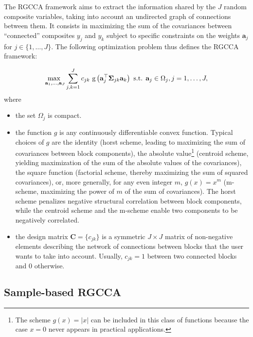 \documentclass[
]{jss}
\begin{document}
The RGCCA framework aims to extract the information shared by the \(J\)
random composite variables, taking into account an undirected graph of
connections between them. It consists in maximizing the sum of the
covariances between ``connected'' composites \(y_j\) and \(y_k\) subject
to specific constraints on the weights \(\mathbf a_j\) for
\(j \in \{1, \ldots, J\}\). The following optimization problem thus
defines the RGCCA framework:

\begin{equation}
\underset{\mathbf{a}_1, \ldots,\mathbf{a}_J}{\text{max }}  \displaystyle  \sum_{j, k = 1}^J c_{jk} \text{
g}\left(\mathbf{a}_j^\top  \mathbf \Sigma_{jk} \mathbf{a}_k\right)\\
\text{ s.t. } \mathbf{a}_j \in \Omega_j, j =1, \ldots, J,
\label{optim_RGCCA}
\end{equation} where

\begin{itemize}
\item the set $\Omega_j$ is compact.

\item the function $g$ is any continuously differentiable convex function. Typical choices of $g$ are the identity (horst scheme, leading to maximizing the sum of covariances between block components), the absolute value\footnote{The scheme $g(x) = \vert x \vert$ can be included in this class of functions because the case $x=0$ never appears in practical applications.} (centroid scheme, yielding maximization of the sum of the absolute values of the covariances), the square function (factorial scheme, thereby maximizing the sum of squared covariances), or, more generally, for any even integer $m$, $g(x) = x^m$ (m-scheme, maximizing the power of $m$ of the sum of covariances). The horst scheme penalizes negative structural correlation between block components, while the centroid scheme and the m-scheme enable two components to be negatively correlated. 

\item the design matrix $\mathbf C = \lbrace c_{jk}\rbrace$ is a symmetric $J \times J$ matrix of non-negative elements describing the network of connections between blocks that the user wants to take into account. Usually, $c_{jk} = 1$ between two connected blocks and $0$ otherwise. 
\end{itemize}

\subsection{Sample-based RGCCA}\label{sample-based-rgcca}
\end{document}
